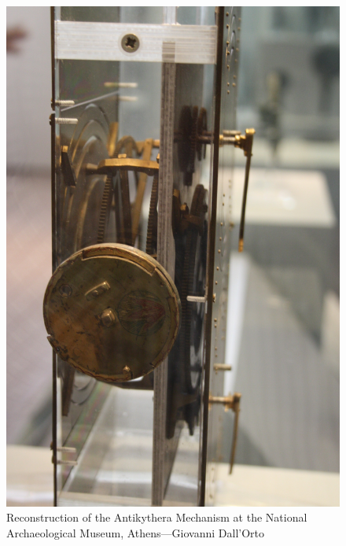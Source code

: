 \begin{figure}
\centering
\includegraphics[width=5in]{antikythera_reconstruction_photo.jpg}
\caption{Reconstruction of the Antikythera Mechanism at the National Archaeological Museum, Athens---Giovanni Dall'Orto}
\label{antikytherareconstruction1}
\end{figure}

